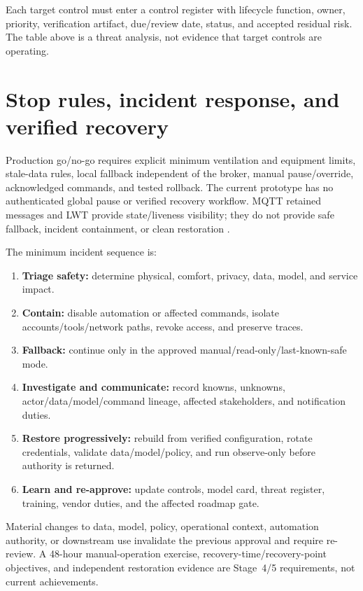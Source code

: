 Each target control must enter a control register with lifecycle function, owner, priority, verification artifact, due/review date, status, and accepted residual risk. The table above is a threat analysis, not evidence that target controls are operating.

\section{Stop rules, incident response, and verified recovery}
Production go/no-go requires explicit minimum ventilation and equipment limits, stale-data rules, local fallback independent of the broker, manual pause/override, acknowledged commands, and tested rollback. The current prototype has no authenticated global pause or verified recovery workflow. MQTT retained messages and LWT provide state/liveness visibility; they do not provide safe fallback, incident containment, or clean restoration \citep{mqtt5}.

The minimum incident sequence is:
\begin{enumerate}
\item \textbf{Triage safety:} determine physical, comfort, privacy, data, model, and service impact.
\item \textbf{Contain:} disable automation or affected commands, isolate accounts/tools/network paths, revoke access, and preserve traces.
\item \textbf{Fallback:} continue only in the approved manual/read-only/last-known-safe mode.
\item \textbf{Investigate and communicate:} record knowns, unknowns, actor/data/model/command lineage, affected stakeholders, and notification duties.
\item \textbf{Restore progressively:} rebuild from verified configuration, rotate credentials, validate data/model/policy, and run observe-only before authority is returned.
\item \textbf{Learn and re-approve:} update controls, model card, threat register, training, vendor duties, and the affected roadmap gate.
\end{enumerate}
Material changes to data, model, policy, operational context, automation authority, or downstream use invalidate the previous approval and require re-review. A 48-hour manual-operation exercise, recovery-time/recovery-point objectives, and independent restoration evidence are Stage~4/5 requirements, not current achievements.
